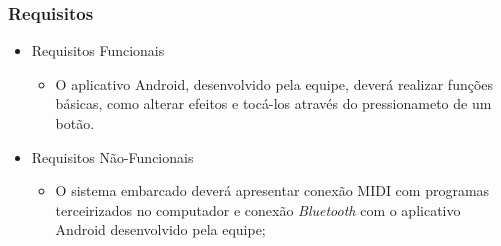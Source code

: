 \documentclass[hyperref={pdfpagelabels=false}]{beamer}
\begin{document}
            \begin{frame}\frametitle{Requisitos}

                \begin{itemize}
                  \item Requisitos Funcionais
                    \begin{itemize}
                      \item O aplicativo Android, desenvolvido pela equipe, deverá realizar funções básicas, como alterar efeitos e tocá-los através do pressionameto de um botão.
                    \end{itemize}
                  \item Requisitos Não-Funcionais
                    \begin{itemize}
                      \item O sistema embarcado deverá apresentar conexão MIDI com programas terceirizados no computador e conexão \textit{Bluetooth} com o aplicativo Android desenvolvido pela equipe;
                    \end{itemize}
                \end{itemize}


            \end{frame}
\end{document}
